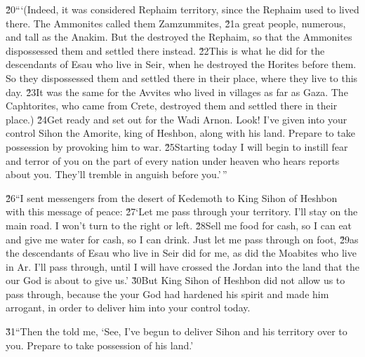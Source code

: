 \v{20}```(Indeed, it was considered Rephaim territory, since the Rephaim used to lived there. The Ammonites called them Zamzummites, \v{21}a great people, numerous, and tall as the Anakim. But the  destroyed the Rephaim, so that the Ammonites dispossessed them and settled there instead. \v{22}This is what he did for the descendants of Esau who live in Seir, when he destroyed the Horites before them. So they dispossessed them and settled there in their place, where they live to this day. \v{23}It was the same for the Avvites who lived in villages as far as Gaza. The Caphtorites, who came from Crete, destroyed them and settled there in their place.) \v{24}Get ready and set out for the Wadi Arnon. Look! I've given into your control Sihon the Amorite, king of Heshbon, along with his land. Prepare to take possession by provoking him to war. \v{25}Starting today I will begin to instill fear and terror of you on the part of every nation under heaven who hears reports about you. They'll tremble in anguish before you.'\,''

\v{26}``I sent messengers from the desert of Kedemoth to King Sihon of Heshbon with this message of peace: \v{27}`Let me pass through your territory. I'll stay on the main road. I won't turn to the right or left. \v{28}Sell me food for cash, so I can eat and give me water for cash, so I can drink. Just let me pass through on foot, \v{29}as the descendants of Esau who live in Seir did for me, as did the Moabites who live in Ar. I'll pass through, until I will have crossed the Jordan into the land that the  our God is about to give us.' \v{30}But King Sihon of Heshbon did not allow us to pass through, because the  your God had hardened his spirit and made him arrogant, in order to deliver him into your control today.

\v{31}``Then the  told me, `See, I've begun to deliver Sihon and his territory over to you. Prepare to take possession of his land.'

